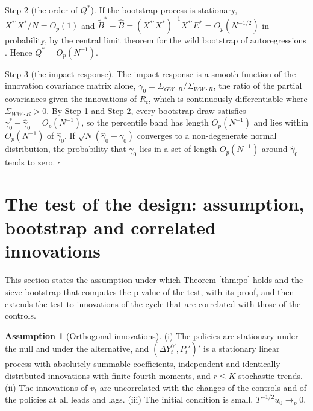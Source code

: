 \documentclass[12pt,a4paper]{article}
\theoremstyle{definition}
\newtheorem{assumption}{Assumption}
\begin{document}
Step 2 (the order of $Q^\ast$). If the bootstrap process is stationary, $X^{\ast\prime}X^\ast/N=O_p(1)$ and $\tilde B^\ast-\hat B=(X^{\ast\prime}X^\ast)^{-1}X^{\ast\prime}E^\ast=O_p(N^{-1/2})$ in probability, by the central limit theorem for the wild bootstrap of autoregressions \citep{goncalveskilian2004,bruggemann2016inference}. Hence $Q^\ast=O_p(N^{-1})$.

Step 3 (the impact response). The impact response is a smooth function of the innovation covariance matrix alone, $\gamma_0=\Sigma_{GW\cdot R}/\Sigma_{WW\cdot R}$, the ratio of the partial covariances given the innovations of $R_t$, which is continuously differentiable where $\Sigma_{WW\cdot R}>0$. By Step 1 and Step 2, every bootstrap draw satisfies $\gamma^\ast_0-\hat\gamma_0=O_p(N^{-1})$, so the percentile band has length $O_p(N^{-1})$ and lies within $O_p(N^{-1})$ of $\hat\gamma_0$. If $\sqrt N(\hat\gamma_0-\gamma_0)$ converges to a non-degenerate normal distribution, the probability that $\gamma_0$ lies in a set of length $O_p(N^{-1})$ around $\hat\gamma_0$ tends to zero. $\square$


\section{The test of the design: assumption, bootstrap and correlated innovations\label{sec:supp-testboot}}\label{sec:supp-test}

This section states the assumption under which Theorem \ref{thm:po} holds and the sieve bootstrap that computes the p-value of the test, with its proof, and then extends the test to innovations of the cycle that are correlated with those of the controls.

\begin{assumption}[Orthogonal innovations\label{assu:T}]
(i) The policies are stationary under the null and under the alternative, and $(\Delta Y^{0\prime}_t,P_t')'$ is a stationary linear process with absolutely summable coefficients, independent and identically distributed innovations with finite fourth moments, and $r\leq K$ stochastic trends. (ii) The innovations of $v_t$ are uncorrelated with the changes of the controls and of the policies at all leads and lags. (iii) The initial condition is small, $T^{-1/2}u_0\to_p0$.
\end{assumption}
\end{document}
